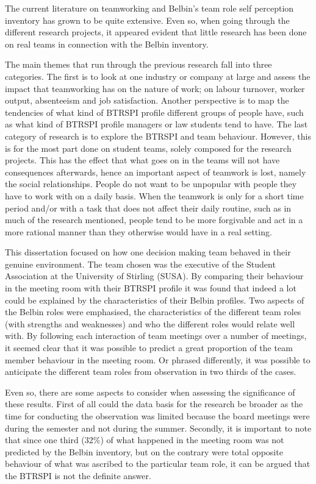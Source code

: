 \documentclass[a4paper,12pt,titlepage]{report}
\begin{document}
  The current literature on teamworking and Belbin's team
  role self perception inventory
  has grown to be quite extensive. Even so, when going through the different research
  projects, it appeared evident that little research has been done
  on real teams in connection with the Belbin inventory.

  The main themes that run through the previous research fall into three categories.
  The first is to look at one industry or company at large and assess
  the impact that teamworking has on the nature of work; on
  labour turnover, worker output, absenteeism and job satisfaction.
  Another perspective is to map the tendencies of what kind of
  BTRSPI profile different
  groups of people have, such as what kind of BTRSPI profile managers or law students
  tend to have. The last category of research is to explore
  the BTRSPI and team behaviour. However, this is for the most part done on student
  teams, solely composed for the research projects. This has the effect that
  what goes on in the teams will not have consequences afterwards, hence an
  important aspect of teamwork is lost, namely the social relationships. People do not
  want to be unpopular with people they have to work with on a daily basis.
  When the teamwork is only for a short time period and/or with a task
  that does not affect their daily routine, such as in much of the research
  mentioned, people tend to be more forgivable and act in a more
  rational manner than they otherwise would have in a real setting.

  This dissertation focused on how one decision making team behaved in their genuine
  environment. The team chosen was the executive of the Student Association
  at the University of Stirling (SUSA). By comparing
  their behaviour in the meeting room
  with their BTRSPI profile it was found that indeed a lot could be explained by
  the characteristics of their Belbin profiles. Two aspects of the Belbin roles
  were emphasised, the characteristics of the different
  team roles (with strengths and weaknesses) and who the different
  roles would relate well with. By
  following each interaction of team meetings over a number of meetings,
  it seemed clear that it was possible to predict a great proportion of the
  team member behaviour in the meeting room. Or phrased differently,
  it was possible to anticipate the different team roles from observation in
  two thirds of the cases.

  Even so, there are some aspects to consider when assessing the
  significance of these results. First of all
  could the data basis for the research be broader as the
  time for conducting the observation was limited because the board meetings
  were during the semester and not during the summer. Secondly, it is important to
  note that since one third (32\%) of what happened in the meeting room was
  not predicted by the Belbin inventory, but on the contrary were
  total opposite behaviour of what was ascribed to the particular team role, it
  can be argued that the BTRSPI is not the definite answer.
\end{document}
